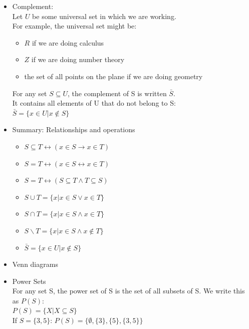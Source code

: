 \documentclass{article}
\begin{document}
\begin{itemize}
\item Complement:\\
Let $U$ be some universal set in which we are working.\\
For example, the universal set might be:
\begin{itemize}
\item $R$ if we are doing calculus
\item $Z$ if we are doing number theory
\item the set of all points on the plane if we are doing geometry
\end{itemize}

For any set $S  \subseteq U$, the complement of S is written $\bar{S}$.\\
It contains all elements of U that do not belong to S:\\
 $\bar{S} = \{x \in U |  x \notin S\}$


\item Summary: Relationships and operations
\begin{itemize}
\item $S \subseteq T \leftrightarrow (x \in S \rightarrow x \in T)$
\item $S = T \leftrightarrow (x \in S \leftrightarrow x \in T)$
\item $S = T \leftrightarrow (S \subseteq T \land T \subseteq S)$\\

\item $S \cup T = \{ x | x \in S \lor x \in T\}$
\item $S \cap T = \{x | x \in S \land x \in T\}$
\item $S \backslash T = \{x | x \in S \land x \notin T\}$
\item $\bar{S} = \{x \in U | x \notin S\}$

\end{itemize}
\item Venn diagrams
\item Power Sets\\
For any set S, the power set of S is the set of all subsets of S.
We write this as $P(S)$:\\
$P(S) = \{X | X \subseteq S\}$\\
If $S = \{3, 5\}$:
$P(S) = \{\emptyset,\{3\},\{5\},\{3,5\}\}$ 


\end{itemize}
\end{document}
